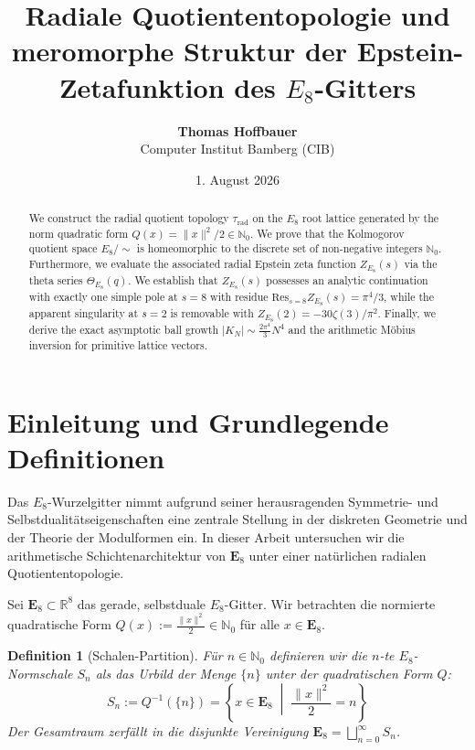 \documentclass[11pt,a4paper]{article}
\title{\textbf{Radiale Quotiententopologie und meromorphe Struktur der Epstein-Zetafunktion des $E_8$-Gitters}}
\author{\textbf{Thomas Hoffbauer} \\ \small Computer Institut Bamberg (CIB)}
\date{1. August 2026}
\newtheorem{definition}{Definition}
\begin{document}
	
	\maketitle
	
	\begin{abstract}
		We construct the radial quotient topology $\tau_{\text{rad}}$ on the $E_8$ root lattice generated by the norm quadratic form $Q(x) = \|x\|^2/2 \in \mathbb{N}_0$. We prove that the Kolmogorov quotient space $E_8 / \sim$ is homeomorphic to the discrete set of non-negative integers $\mathbb{N}_0$. Furthermore, we evaluate the associated radial Epstein zeta function $Z_{E_8}(s)$ via the theta series $\Theta_{E_8}(q)$. We establish that $Z_{E_8}(s)$ possesses an analytic continuation with exactly one simple pole at $s=8$ with residue $\text{Res}_{s=8} Z_{E_8}(s) = \pi^4 / 3$, while the apparent singularity at $s=2$ is removable with $Z_{E_8}(2) = -30\zeta(3)/\pi^2$. Finally, we derive the exact asymptotic ball growth $|K_N| \sim \frac{2\pi^4}{3} N^4$ and the arithmetic Möbius inversion for primitive lattice vectors.
	\end{abstract}
	
	
	\section{Einleitung und Grundlegende Definitionen}
	
	Das $E_8$-Wurzelgitter nimmt aufgrund seiner herausragenden Symmetrie- und Selbstdualitätseigenschaften eine zentrale Stellung in der diskreten Geometrie und der Theorie der Modulformen ein. In dieser Arbeit untersuchen wir die arithmetische Schichtenarchitektur von $\mathbf{E}_8$ unter einer natürlichen radialen Quotiententopologie.
	
	Sei $\mathbf{E}_8 \subset \mathbb{R}^8$ das gerade, selbstduale $E_8$-Gitter. Wir betrachten die normierte quadratische Form $Q(x) := \frac{\|x\|^2}{2} \in \mathbb{N}_0$ für alle $x \in \mathbf{E}_8$.
	
	\begin{definition}[Schalen-Partition]
		Für $n \in \mathbb{N}_0$ definieren wir die $n$-te $E_8$-Normschale $S_n$ als das Urbild der Menge $\{n\}$ unter der quadratischen Form $Q$:
		$$S_n := Q^{-1}(\{n\}) = \left\{ x \in \mathbf{E}_8 \;\middle|\; \frac{\|x\|^2}{2} = n \right\}$$
		Der Gesamtraum zerfällt in die disjunkte Vereinigung $\mathbf{E}_8 = \bigsqcup_{n=0}^{\infty} S_n$.
	\end{definition}
	
\end{document}
